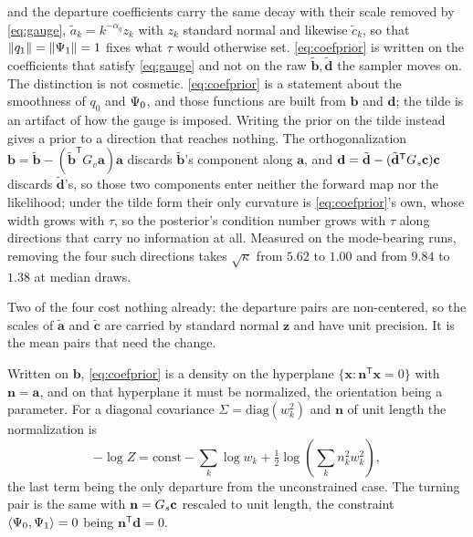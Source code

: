 \documentclass[11pt]{article}
\theoremstyle{plain}
\begin{document}
and the departure coefficients carry the same decay with their scale removed by
\eqref{eq:gauge}, $\tilde a_{k} = k^{-\alpha_{q}}z_{k}$ with $z_{k}$ standard normal and
likewise $\tilde c_{k}$, so that $\|q_{1}\| = \|\Psi_{1}\| = 1$ fixes what $\tau$ would
otherwise set. \eqref{eq:coefprior} is written on the coefficients that satisfy
\eqref{eq:gauge} and not on the raw $\tilde{\mathbf{b}}, \tilde{\mathbf{d}}$ the sampler
moves on. The distinction is not
cosmetic. \eqref{eq:coefprior} is a statement about the smoothness of $q_{0}$ and
$\Psi_{0}$, and those functions are built from $\mathbf{b}$ and $\mathbf{d}$; the tilde is
an artifact of how the gauge is imposed. Writing the prior on the tilde instead gives a
prior to a direction that reaches nothing. The orthogonalization
$\mathbf{b} = \tilde{\mathbf{b}} - (\tilde{\mathbf{b}}^{\mathsf T}G_{v}\mathbf{a})\mathbf{a}$
discards $\tilde{\mathbf{b}}$'s component along $\mathbf{a}$, and
$\mathbf{d} = \tilde{\mathbf{d}} - (\tilde{\mathbf{d}}^{\mathsf T}G_{s}\mathbf{c})\mathbf{c}$
discards $\tilde{\mathbf{d}}$'s, so those two components enter neither the forward map nor
the likelihood; under the tilde form their only curvature is
\eqref{eq:coefprior}'s own, whose width grows with $\tau$, so the posterior's condition
number grows with $\tau$ along directions that carry no information at all. Measured on
the mode-bearing runs, removing the four such directions takes $\sqrt{\kappa}$ from $5.62$
to $1.00$ and from $9.84$ to $1.38$ at median draws.

Two of the four cost nothing already: the departure pairs are non-centered, so the scales
of $\tilde{\mathbf{a}}$ and $\tilde{\mathbf{c}}$ are carried by standard normal
$\mathbf{z}$ and have unit precision. It is the mean pairs that need the change.

Written on $\mathbf{b}$, \eqref{eq:coefprior} is a density on the hyperplane
$\{\mathbf{x} : \mathbf{n}^{\mathsf T}\mathbf{x} = 0\}$ with $\mathbf{n} = \mathbf{a}$, and
on that hyperplane it must be normalized, the orientation being a parameter. For a
diagonal covariance $\Sigma = \mathrm{diag}(w_{k}^{2})$ and $\mathbf{n}$ of unit length the
normalization is
\begin{equation}
  -\log Z = \mathrm{const} - \sum_{k}\log w_{k}
          + \tfrac{1}{2}\log\!\left(\sum_{k} n_{k}^{2} w_{k}^{2}\right) ,
  \label{eq:hypernorm}
\end{equation}
the last term being the only departure from the unconstrained case. The turning pair is
the same with $\mathbf{n} = G_{s}\mathbf{c}$ rescaled to unit length, the constraint
$\langle \Psi_{0}, \Psi_{1}\rangle = 0$ being $\mathbf{n}^{\mathsf T}\mathbf{d} = 0$.
\end{document}
